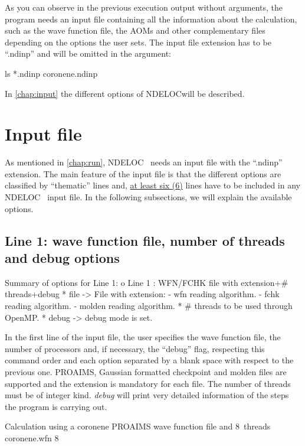\documentclass[a4paper,11pt,openany]{memoir}
\newcommand\programa{\textsc{NDELOC}}
\begin{document}
As you can observe in the previous execution output without arguments, the program needs an input file containing all the information about the calculation, such as the wave function file, the \acp{AOM} and other complementary files depending on the options the user sets. The input file extension has to be ``.ndinp'' and will be omitted in the argument:
\begin{consola}{ls *.ndinp}
coronene.ndinp
\end{consola}
In \autoref{chap:input} the different options of \programa will be described.

\chapter{Input file}\label{chap:input}
As mentioned in \autoref{chap:run}, \programa~ needs an input file with the ``.ndinp'' extension. The main feature of the input file is that the different options are classified by ``thematic'' lines and, \underline{at least six (6)} lines have to be included in any \programa~ input file. In the following subsections, we will explain the available options.

\section{Line 1: wave function file, number of threads and debug options}\label{sec:line1}
\begin{recuadro}{Summary of options for Line 1:}
o Line 1 :  WFN/FCHK file with extension+# threads+debug
 *  file   -> File with extension:
  - wfn    reading algorithm.        
  - fchk   reading algorithm.        
  - molden reading algorithm.        
 *  # threads to be used through OpenMP.
 *  debug  -> debug mode is set.
\end{recuadro}
In the first line of the input file, the user specifies the wave function file, the number of processors and, if necessary, the ``debug'' flag, respecting this command order and each option separated by a blank space with respect to the previous one. PROAIMS, Gaussian formatted checkpoint and molden files are supported and the extension is mandatory for each file. The number of threads must be of integer kind. \emph{debug} will print very detailed information of the steps the program is carrying out.
\begin{myexample}{Calculation using a coronene PROAIMS wave function file and \SI{8}{threads}}
	coronene.wfn 8
\end{myexample}
\end{document}
